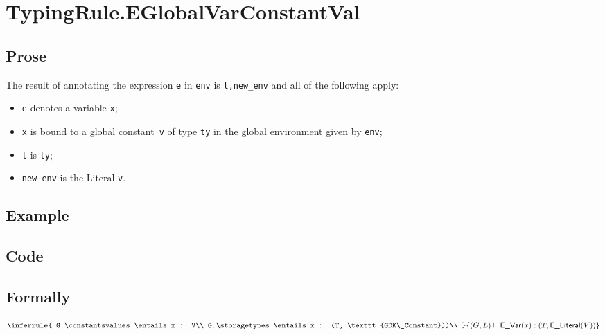 \documentclass{book}
\newcommand\eliteral[1]{\textsf{E\_Literal}(#1)}
\begin{document}
\section{TypingRule.EGlobalVarConstantVal \label{sec:TypingRule.EGlobalVarConstant}}

  \subsection{Prose}
  The result of annotating the expression \texttt{e} in \texttt{env} is
\texttt{t,new\_env} and all of the following apply: 
  \begin{itemize}
  \item \texttt{e} denotes a variable \texttt{x};
  \item \texttt{x} is bound to a global constant~\texttt{v} of type \texttt{ty} in the global environment given by \texttt{env};
  \item \texttt{t} is \texttt{ty};
  \item \texttt{new\_env} is the Literal \texttt{v}.
  \end{itemize}

  \subsection{Example}

  \subsection{Code}

\begin{emptyformal}
  \subsection{Formally}
\[
\inferrule{
  G.\constantsvalues \entails x : V\\
  G.\storagetypes \entails x : (T, \texttt{GDK\_Constant}))\\
  }
{(G,L) \entails \evar(x) : (T, \eliteral{V})}
\]
\end{emptyformal}


\end{document}
